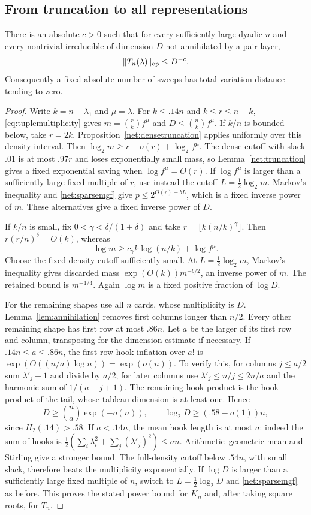 \subsection{From truncation to all representations}\label{net:completion}
\begin{theorem}\label{net:main}
There is an absolute $c>0$ such that for every sufficiently large dyadic $n$ and every nontrivial irreducible of dimension $D$ not annihilated by a pair layer,
\[
 \|T_n(\lambda)\|_{\mathrm{op}}\le D^{-c}.
\]
Consequently a fixed absolute number of sweeps has total-variation distance tending to zero.
\end{theorem}
\begin{proof}
Write $k=n-\lambda_1$ and $\mu=\bar\lambda$. For $k\le.14n$ and $k\le r\le n-k$, \eqref{eq:tuplemultiplicity} gives $m=\binom rk f^\mu$ and $D\le\binom nk f^\mu$.
If $k/n$ is bounded below, take $r=2k$. Proposition~\ref{net:densetruncation} applies uniformly over this density interval. Then $\log_2m\ge r-o(r)+\log_2 f^\mu$. The dense cutoff with slack $.01$ is at most $.97r$ and loses exponentially small mass, so Lemma~\ref{net:truncation} gives a fixed exponential saving when $\log f^\mu=O(r)$. If $\log f^\mu$ is larger than a sufficiently large fixed multiple of $r$, use instead the cutoff $L=\frac12\log_2m$. Markov's inequality and \eqref{net:sparsemgf} give $p\le2^{O(r)-bL}$, which is a fixed inverse power of $m$. These alternatives give a fixed inverse power of $D$.

If $k/n$ is small, fix $0<\gamma<\delta/(1+\delta)$ and take $r=\lfloor k(n/k)^\gamma\rfloor$. Then $r(r/n)^\delta=O(k)$, whereas
\[
 \log m\ge c_\gamma k\log(n/k)+\log f^\mu.
\]
Choose the fixed density cutoff sufficiently small. At $L=\frac12\log_2m$, Markov's inequality gives discarded mass $\exp(O(k))m^{-b/2}$, an inverse power of $m$. The retained bound is $m^{-1/4}$. Again $\log m$ is a fixed positive fraction of $\log D$.

For the remaining shapes use all $n$ cards, whose multiplicity is $D$. Lemma~\ref{lem:annihilation} removes first columns longer than $n/2$. Every other remaining shape has first row at most $.86n$. Let $a$ be the larger of its first row and column, transposing for the dimension estimate if necessary. If $.14n\le a\le.86n$, the first-row hook inflation over $a!$ is $\exp(O((n/a)\log n))=\exp(o(n))$. To verify this, for columns $j\le a/2$ sum $\lambda'_j-1$ and divide by $a/2$; for later columns use $\lambda'_j\le n/j\le2n/a$ and the harmonic sum of $1/(a-j+1)$. The remaining hook product is the hook product of the tail, whose tableau dimension is at least one. Hence
\[
 D\ge\binom na\exp(-o(n)),\qquad \log_2D\ge(.58-o(1))n,
\]
since $H_2(.14)>.58$. If $a<.14n$, the mean hook length is at most $a$: indeed the sum of hooks is $\frac12(\sum_i\lambda_i^2+\sum_j(\lambda'_j)^2)\le an$. Arithmetic--geometric mean and Stirling give a stronger bound. The full-density cutoff below $.54n$, with small slack, therefore beats the multiplicity exponentially. If $\log D$ is larger than a sufficiently large fixed multiple of $n$, switch to $L=\frac12\log_2D$ and \eqref{net:sparsemgf} as before. This proves the stated power bound for $K_n$ and, after taking square roots, for $T_n$.


\end{proof}
